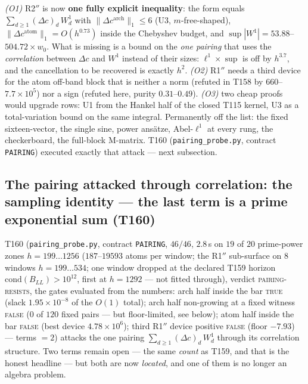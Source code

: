 \documentclass[11pt,a4paper]{article}
\begin{document}
\begin{keybox}
\emph{(O1)} R2$''$ is now \textbf{one fully explicit inequality}: the form equals
$\sum_{d\ge1}(\Delta c)_d\,W^1_d$ with $\|\Delta c^{\mathrm{arch}}\|_1\le6$ (U3,
$m$-free-shaped), $\|\Delta c^{\mathrm{atom}}\|_1=O(h^{0.73})$ inside the
Chebyshev budget, and $\sup|W^1|=53.88$--$504.72\times w_0$. What is missing is a
bound on the \emph{one pairing} that uses the \emph{correlation} between
$\Delta c$ and $W^1$ instead of their sizes: $\ell^1\times\sup$ is off by
$h^{3.7}$, and the cancellation to be recovered is exactly $h^2$. \emph{(O2)}
R1$''$ needs a third device for the atom off-band block that is neither a norm
(refuted in T158 by $660$--$7.7\times10^{5}$) nor a sign (refuted here, purity
$0.31$--$0.49$). \emph{(O3)} two cheap proofs would upgrade rows: U1 from the
Hankel half of the closed T115 kernel, U3 as a total-variation bound on the same
integral. Permanently off the list: the fixed sixteen-vector, the single sine,
power ans\"atze, Abel-$\ell^1$ at every rung, the checkerboard, the full-block
M-matrix. T160 (\texttt{pairing\_probe.py}, contract \texttt{PAIRING}) executed
exactly that attack --- next subsection.
\end{keybox}

\subsection{The pairing attacked through correlation: the sampling identity ---
the last term is a prime exponential sum (T160)}
T160 (\texttt{pairing\_probe.py}, contract \texttt{PAIRING}, $46/46$, $2.8$\,s on
$19$ of $20$ prime-power zones $h=199\ldots1256$ ($187$--$19593$ atoms per window;
the R1$''$ sub-surface on $8$ windows $h=199\ldots534$; one window dropped at the
declared T159 horizon $\mathrm{cond}(B_{LL})>10^{12}$, first at $h=1292$ --- not
fitted through), verdict \textsc{pairing-resists}, the gates evaluated from the
numbers: arch half inside the bar \textsc{true} (slack $1.95\times10^{-8}$ of the
$O(1)$ total); arch half non-growing at a fixed witness \textsc{false} ($0$ of
$120$ fixed pairs --- but floor-limited, see below); atom half inside the bar
\textsc{false} (best device $4.78\times10^{6}$); third R1$''$ device positive
\textsc{false} (floor $-7.93$) --- terms $=2$) attacks the one pairing
$\sum_{d\ge1}(\Delta c)_d\,W^1_d$ through its correlation structure. Two terms
remain open --- the same \emph{count} as T159, and that is the honest headline ---
but both are now \emph{located}, and one of them is no longer an algebra problem.
\end{document}
